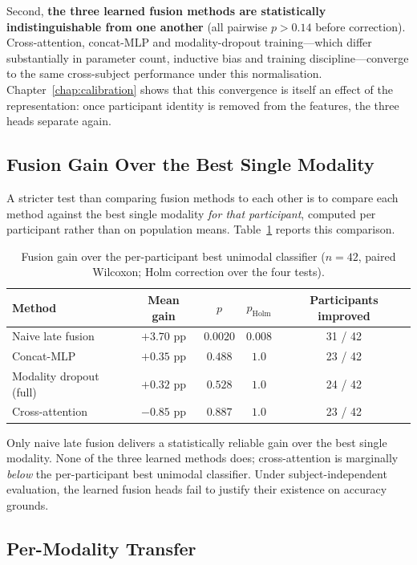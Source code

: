 Second, \textbf{the three learned fusion methods are statistically indistinguishable
from one another} (all pairwise $p > 0.14$ before correction). Cross-attention,
concat-MLP and modality-dropout training---which differ substantially in parameter
count, inductive bias and training discipline---converge to the same cross-subject
performance under this normalisation. Chapter~\ref{chap:calibration} shows that this
convergence is itself an effect of the representation: once participant identity is
removed from the features, the three heads separate again.

\subsection{Fusion Gain Over the Best Single Modality}

A stricter test than comparing fusion methods to each other is to compare each method
against the best single modality \emph{for that participant}, computed per
participant rather than on population means. Table~\ref{tab:cs_gain} reports this
comparison.

\begin{table}[htbp]
\centering
\caption{Fusion gain over the per-participant best unimodal classifier
($n = 42$, paired Wilcoxon; Holm correction over the four tests).}
\label{tab:cs_gain}
\begin{tabular}{lcccc}
\hline
\textbf{Method} & \textbf{Mean gain} & \textbf{$p$} & \textbf{$p_{\mathrm{Holm}}$} & \textbf{Participants improved} \\
\hline
Naive late fusion       & $+3.70$ pp & $0.0020$ & $0.008$ & 31 / 42 \\
Concat-MLP              & $+0.35$ pp & $0.488$  & $1.0$   & 23 / 42 \\
Modality dropout (full) & $+0.32$ pp & $0.528$  & $1.0$   & 24 / 42 \\
Cross-attention         & $-0.85$ pp & $0.887$  & $1.0$   & 23 / 42 \\
\hline
\end{tabular}
\end{table}

Only naive late fusion delivers a statistically reliable gain over the best single
modality. None of the three learned methods does; cross-attention is marginally
\emph{below} the per-participant best unimodal classifier. Under subject-independent
evaluation, the learned fusion heads fail to justify their existence on accuracy
grounds.

\subsection{Per-Modality Transfer}
\label{sec:cs_permodality}

